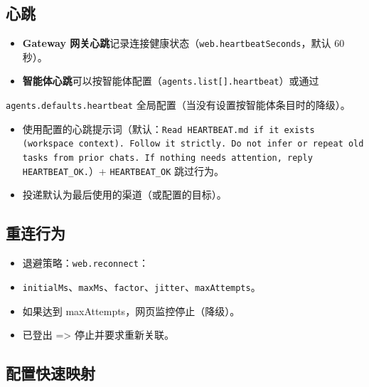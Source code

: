 \subsection{心跳}


\begin{itemize}
  \item \textbf{Gateway 网关心跳}记录连接健康状态（\texttt{web.heartbeatSeconds}，默认 60 秒）。
  \item \textbf{智能体心跳}可以按智能体配置（\texttt{agents.list[].heartbeat}）或通过
\end{itemize}

\texttt{agents.defaults.heartbeat} 全局配置（当没有设置按智能体条目时的降级）。
\begin{itemize}
  \item 使用配置的心跳提示词（默认：\texttt{Read HEARTBEAT.md if it exists (workspace context). Follow it strictly. Do not infer or repeat old tasks from prior chats. If nothing needs attention, reply HEARTBEAT\_OK.}）+ \texttt{HEARTBEAT\_OK} 跳过行为。
  \item 投递默认为最后使用的渠道（或配置的目标）。
\end{itemize}


\subsection{重连行为}


\begin{itemize}
  \item 退避策略：\texttt{web.reconnect}：
  \item \texttt{initialMs}、\texttt{maxMs}、\texttt{factor}、\texttt{jitter}、\texttt{maxAttempts}。
  \item 如果达到 maxAttempts，网页监控停止（降级）。
  \item 已登出 => 停止并要求重新关联。
\end{itemize}


\subsection{配置快速映射}


